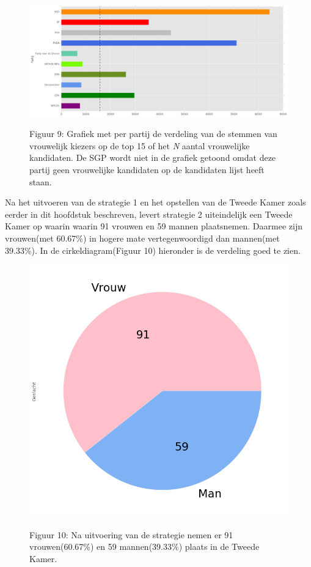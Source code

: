 \begin{figure}[H]
\begin{center}
	\includegraphics[width=\linewidth]	{stemmen_op_vrouwen_top15_of_topN.png}
		\begin{center}
			Figuur 9: Grafiek met per partij de verdeling van de stemmen van vrouwelijk kiezers op de top 15 of het \textit{N} aantal vrouwelijke kandidaten. De SGP wordt niet in de grafiek getoond omdat deze partij geen vrouwelijke kandidaten op de kandidaten lijst heeft staan. 
		\end{center}
\end{center}
\end{figure}

Na het uitvoeren van de strategie 1 en het opstellen van de Tweede Kamer zoals eerder in dit hoofdstuk beschreven, levert strategie 2 uiteindelijk een Tweede Kamer op waarin waarin 91 vrouwen  en 59 mannen plaatsnemen. Daarmee zijn vrouwen(met 60.67\%) in hogere mate vertegenwoordigd dan mannen(met 39.33\%). In de cirkeldiagram(Figuur 10) hieronder is de verdeling goed te zien. 

\begin{figure}[H]
\begin{center}
	\includegraphics[width=0.7\linewidth]{pie_chart_top15_of_topN.png}
		\begin{center}
			Figuur 10: Na uitvoering van de strategie nemen er 91 vrouwen(60.67\%) en 59 mannen(39.33\%) plaats in de Tweede Kamer. 
		\end{center}
\end{center}
\end{figure}

